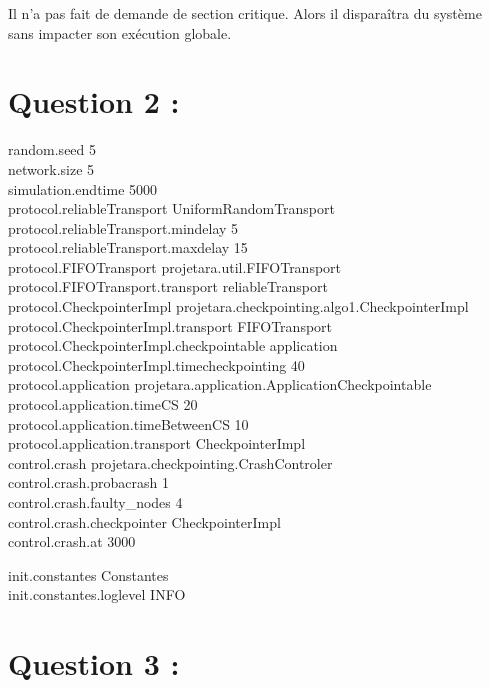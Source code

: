 \documentclass[11pt,a4paper]{report}
\begin{document}
 Il n'a pas fait de demande de section critique. Alors il disparaîtra du système sans impacter son exécution globale.\\


\section{Question 2 :}

random.seed 5\\
network.size 5\\
simulation.endtime 5000\\

protocol.reliableTransport UniformRandomTransport\\
protocol.reliableTransport.mindelay 5\\
protocol.reliableTransport.maxdelay 15\\

protocol.FIFOTransport projetara.util.FIFOTransport\\
protocol.FIFOTransport.transport reliableTransport\\

protocol.CheckpointerImpl projetara.checkpointing.algo1.CheckpointerImpl\\
protocol.CheckpointerImpl.transport FIFOTransport\\
protocol.CheckpointerImpl.checkpointable application\\
protocol.CheckpointerImpl.timecheckpointing 40\\

protocol.application projetara.application.ApplicationCheckpointable\\
protocol.application.timeCS 20\\
protocol.application.timeBetweenCS 10\\
protocol.application.transport CheckpointerImpl\\

control.crash projetara.checkpointing.CrashControler\\
control.crash.probacrash 1\\
control.crash.faulty\_nodes 4\\
control.crash.checkpointer CheckpointerImpl\\
control.crash.at 3000

init.constantes Constantes\\
init.constantes.loglevel INFO\\


\section{Question 3 :}
\end{document}
